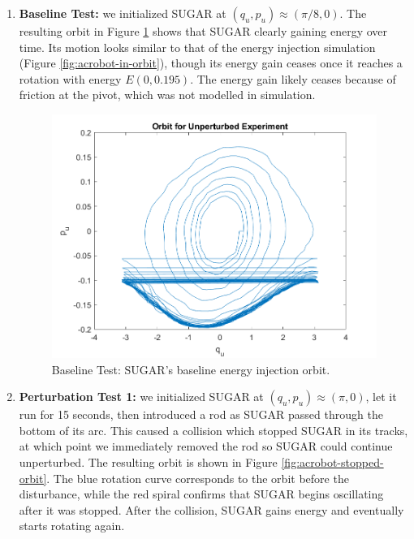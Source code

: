 \documentclass[journal,twoside,web, twocolumn,draftcls]{ieeecolor}
\begin{document}
\begin{enumerate}
    \item \textbf{Baseline Test:} 
    we initialized SUGAR at 
    \((q_u,p_u) \approx \left(\pi/8,0\right)\). 
    The resulting orbit in Figure \ref{fig:acrobot-unperturbed-orbit} shows
    that SUGAR clearly gaining energy over time.
    Its motion looks similar to that of the energy injection simulation (Figure
    \ref{fig:acrobot-in-orbit}), though its energy gain ceases once it reaches a
    rotation with energy \(E(0,0.195)\).
    The energy gain likely ceases because of friction at the pivot, which was
    not modelled in simulation.

\begin{figure}
    \centering
    \includegraphics[width=0.8\linewidth]{acrobot_unperturbed_orbit.png}
    \caption{Baseline Test: SUGAR's baseline energy injection orbit.}
    \label{fig:acrobot-unperturbed-orbit}
\end{figure}

\item \textbf{Perturbation Test 1:}
    we initialized SUGAR at 
    \((q_u,p_u) \approx \left(\pi,0\right)\), let it run for 15
    seconds, then introduced a rod as SUGAR passed through the bottom of
    its arc.
    This caused a collision which stopped SUGAR in its tracks, at which
    point we immediately removed the rod so SUGAR could continue
    unperturbed.
    The resulting orbit is shown in Figure \ref{fig:acrobot-stopped-orbit}.
    The blue rotation curve corresponds to the orbit before the disturbance,
    while the red spiral confirms that SUGAR begins oscillating after it
    was stopped.  
    After the collision, SUGAR gains energy and eventually starts
    rotating again.


\end{enumerate}
\end{document}
